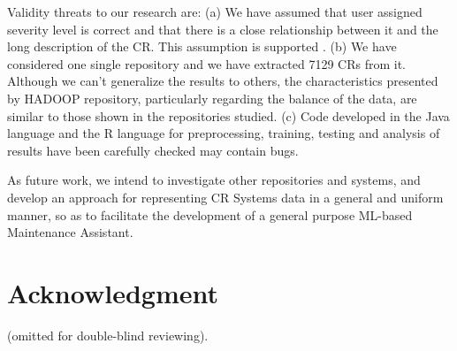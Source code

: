 \documentclass[10pt, conference]{IEEEtran}
\begin{document}
Validity threats to our research are: (a) We have assumed that user assigned severity level is correct and that there is a close relationship between it and the long description of the CR. This assumption is supported  \cite{Lamkanfi2010, Tian2012}. (b) We have considered one single repository and we have extracted 7129 CRs from it. Although we can't generalize the results to others, the characteristics presented by HADOOP repository, particularly regarding the balance of the data, are similar to those shown in the repositories studied\cite{Lamkanfi2010, Lamkanfi2011, Tian2012,ValdiviaGarcia2014}. (c) Code developed in the Java language and the R language for preprocessing, training, testing and analysis of results have been carefully checked may contain bugs.

As future work, we intend to investigate other repositories and systems, and develop an approach for representing CR Systems data in a general and uniform manner, so as to facilitate the development of a general purpose ML-based Maintenance Assistant. 

\section*{Acknowledgment}
(omitted for double-blind reviewing). 





%
%





\end{document}
